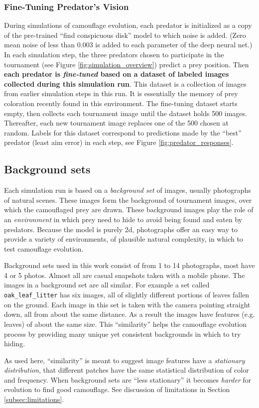 \documentclass[acmtog]{acmart}
\newcommand{\jargon}[1]{\textit{#1}}
\begin{document}
\subsubsection{Fine-Tuning Predator's Vision}
During simulations of camouflage evolution, each predator is initialized as a copy of the pre-trained “find conspicuous disk” model to which noise is added. (Zero mean noise of less than 0.003 is added to each parameter of the deep neural net.) In each simulation step, the three predators chosen to participate in the tournament (see Figure \ref{fig:simulation_overview}) predict a prey position. Then \textbf{each predator is \jargon{fine-tuned} based on a dataset of labeled images collected during this simulation run}. This dataset is a collection of images from earlier simulation steps in this run. It is essentially the memory of prey coloration recently found in this environment. The fine-tuning dataset starts empty, then collects each tournament image until the dataset holds 500 images. Thereafter, each new tournament image replaces one of the 500 chosen at random. Labels for this dataset correspond to predictions made by the “best” predator (least aim error) in each step, see Figure \ref{fig:predator_responses}.
\par


\subsection{Background sets}
\label{subsec:background_sets}
Each simulation run is based on a \jargon{background set} of images, usually photographs of natural scenes. These images form the background of tournament images, over which the camouflaged prey are drawn. These background images play the role of an \jargon{environment} in which prey need to hide to avoid being found and eaten by predators. Because the model is purely 2d, photographs offer an easy way to provide a variety of environments, of plausible natural complexity, in which to test camouflage evolution.
\par
Background sets used in this work consist of from 1 to 14 photographs, most have 4 or 5 photos. Almost all are casual snapshots taken with a mobile phone. The images in a background set are all similar. For example a set called \texttt{oak\_leaf\_litter} has six images, all of slightly different portions of leaves fallen on the ground. Each image in this set is taken with the camera pointing straight down, all from about the same distance. As a result the images have features (e.g. leaves) of about the same size. This “similarity” helps the camouflage evolution process by providing many unique yet consistent backgrounds in which to try hiding.
\par
As used here, “similarity” is meant to suggest image features have a \jargon{stationary distribution}, that different patches have the same statistical distribution of color and frequency. When background sets are “less stationary” it becomes \jargon{harder} for evolution to find good camouflage. See discussion of limitations in Section \ref{subsec:limitations}.
\end{document}
